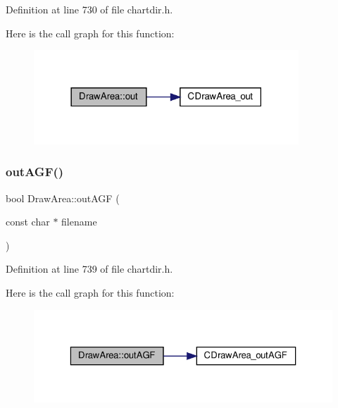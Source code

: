 Definition at line 730 of file chartdir.\+h.

Here is the call graph for this function\+:
\nopagebreak
\begin{figure}[H]
\begin{center}
\leavevmode
\includegraphics[width=282pt]{class_draw_area_ae9ead4ed0341bb6dc724bed992f9f973_cgraph}
\end{center}
\end{figure}
\mbox{\label{class_draw_area_ab0754b856e76ed952c6888bcda401d19}} 
\subsubsection{\texorpdfstring{out\+A\+G\+F()}{outAGF()}\hspace{0.1cm}{\footnotesize\ttfamily [1/2]}}
{\footnotesize\ttfamily bool Draw\+Area\+::out\+A\+GF (\begin{DoxyParamCaption}\item[{const char $\ast$}]{filename }\end{DoxyParamCaption})\hspace{0.3cm}{\ttfamily [inline]}}



Definition at line 739 of file chartdir.\+h.

Here is the call graph for this function\+:
\nopagebreak
\begin{figure}[H]
\begin{center}
\leavevmode
\includegraphics[width=323pt]{class_draw_area_ab0754b856e76ed952c6888bcda401d19_cgraph}
\end{center}
\end{figure}
\mbox{\label{class_draw_area_a503e5378dd94d121834067ebe61db5e7}} 
